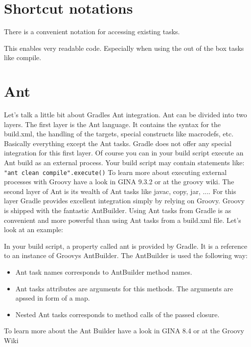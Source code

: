 \section{Shortcut notations}
There is a convenient notation for accessing existing tasks.

This enables very readable code. Especially when using the out of the box tasks like compile.

\section{Ant}
Let's talk a little bit about Gradles Ant integration. Ant can be divided into two layers. The first layer is the Ant language. It contains the syntax for the build.xml, the handling of the targets, special constructs like macrodefs, etc. Basically everything except the Ant tasks. Gradle does not offer any special integration for this first layer. Of course you can in your build script execute an Ant build as an external process. Your build script may contain statements like: \texttt{"ant clean compile".execute()}
To learn more about executing external processes with Groovy have a look in GINA 9.3.2 or at the groovy wiki.
The second layer of Ant is its wealth of Ant tasks like javac, copy, jar, .... For this layer Gradle provides excellent integration simply by relying on Groovy. Groovy is shipped with the fantastic AntBuilder. Using Ant tasks from Gradle is as convenient and more powerful than using Ant tasks from a build.xml file. Let's look at an example:

In your build script, a property called ant is provided by Gradle. It is a reference to an instance of Groovys AntBuilder. The AntBuilder is used the following way:
\begin{itemize}
\item Ant task names corresponds to AntBuilder method names.
\item Ant tasks attributes are arguments for this methods. The arguments are apssed in form of a map.
\item Nested Ant tasks corresponds to method calls of the passed closure.
\end{itemize}
To learn more about the Ant Builder have a look in GINA 8.4 or at the Groovy Wiki

